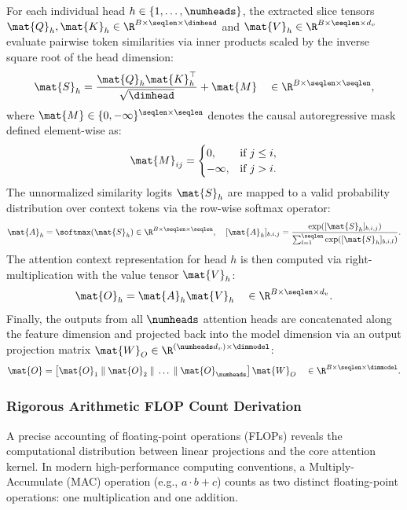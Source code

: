 For each individual head $h \in \{1, \dots, \numheads\}$, the extracted slice tensors $\mat{Q}_h, \mat{K}_h \in \R^{B \times \seqlen \times \dimhead}$ and $\mat{V}_h \in \R^{B \times \seqlen \times d_v}$ evaluate pairwise token similarities via inner products scaled by the inverse square root of the head dimension:
\begin{equation}
\mat{S}_h = \frac{\mat{Q}_h \mat{K}_h^\top}{\sqrt{\dimhead}} + \mat{M} \quad \in \R^{B \times \seqlen \times \seqlen},
\label{eq:similarity_matrix}
\end{equation}
where $\mat{M} \in \{0, -\infty\}^{\seqlen \times \seqlen}$ denotes the causal autoregressive mask defined element-wise as:
\begin{equation}
\mat{M}_{ij} = \begin{cases} 
0, & \text{if } j \le i, \\ 
-\infty, & \text{if } j > i. 
\end{cases}
\label{eq:causal_mask_def}
\end{equation}
The unnormalized similarity logits $\mat{S}_h$ are mapped to a valid probability distribution over context tokens via the row-wise softmax operator:
\begin{equation}
\mat{A}_h = \softmax(\mat{S}_h) \in \R^{B \times \seqlen \times \seqlen}, \quad [\mat{A}_h]_{b, i, j} = \frac{\exp([\mat{S}_h]_{b, i, j})}{\sum_{l=1}^\seqlen \exp([\mat{S}_h]_{b, i, l})}.
\label{eq:softmax_attention_weights}
\end{equation}
The attention context representation for head $h$ is then computed via right-multiplication with the value tensor $\mat{V}_h$:
\begin{equation}
\mat{O}_h = \mat{A}_h \mat{V}_h \quad \in \R^{B \times \seqlen \times d_v}.
\label{eq:head_context_output}
\end{equation}
Finally, the outputs from all $\numheads$ attention heads are concatenated along the feature dimension and projected back into the model dimension via an output projection matrix $\mat{W}_O \in \R^{(\numheads d_v) \times \dimmodel}$:
\begin{equation}
\mat{O} = \left[ \mat{O}_1 \;\|\; \mat{O}_2 \;\|\; \dots \;\|\; \mat{O}_\numheads \right] \mat{W}_O \quad \in \R^{B \times \seqlen \times \dimmodel}.
\label{eq:multihead_output_projection}
\end{equation}

\subsubsection{Rigorous Arithmetic FLOP Count Derivation}
\label{subsubsec:flop_count_derivation}
A precise accounting of floating-point operations (FLOPs) reveals the computational distribution between linear projections and the core attention kernel. In modern high-performance computing conventions, a Multiply-Accumulate (MAC) operation (e.g., $a \cdot b + c$) counts as two distinct floating-point operations: one multiplication and one addition.

